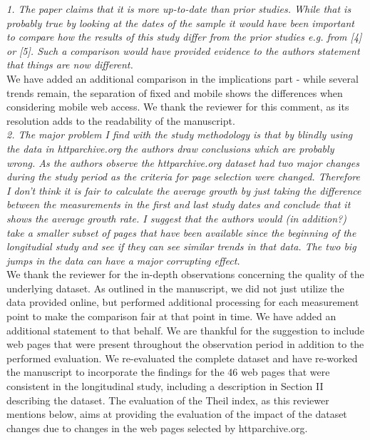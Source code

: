 \documentclass[11pt, draftclsnofoot, onecolumn]{IEEEtran}
\begin{document}
{{\noindent \textit{1. The paper claims that it is more up-to-date than prior studies. While that is probably true by looking at the dates of the sample it would have been important to compare how the results of this study differ from the prior studies e.g. from [4] or [5]. Such a comparison would have provided evidence to the authors statement that things are now different.}\\
We have added an additional comparison in the implications part - while several trends remain, the separation of fixed and mobile shows the differences when considering mobile web access. We thank the reviewer for this comment, as its resolution adds to the readability of the manuscript.\\


\noindent \textit{2. The major problem I find with the study methodology is that by blindly using the data in httparchive.org the authors draw conclusions which are probably wrong. As the authors observe the httparchive.org dataset had two major changes during the study period as the criteria for page selection were changed. Therefore I don't think it is fair to calculate the average growth by just taking the difference between the measurements in the first and last study dates and conclude that it shows the average growth rate. I suggest that the authors would (in addition?) take a smaller subset of pages that have been available since the beginning of the longitudial study and see if they can see similar trends in that data. The two big jumps in the data can have a major corrupting effect.}\\
We thank the reviewer for the in-depth observations concerning the quality of the underlying dataset. 
As outlined in the manuscript, we did not just utilize the data provided online, but performed additional processing for each measurement point to make the comparison fair at that point in time. We have added an additional statement to that behalf.
We are thankful for the suggestion to include web pages that were present throughout the observation period in addition to the performed evaluation. We re-evaluated the complete dataset and have re-worked the manuscript to incorporate the findings for the 46 web pages that were consistent in the longitudinal study, including a description in Section II describing the dataset. 
The evaluation of the Theil index, as this reviewer mentions below, aims at providing the evaluation of the impact of the dataset changes due to changes in the web pages selected by httparchive.org.
\\


}}
\end{document}
